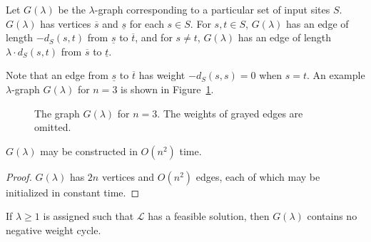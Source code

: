 \documentclass{llncs}
\def \figurescale {.85}
\begin{document}
\begin{definition}
\label{definition:G}
Let $G(\lambda)$ be the $\lambda$-graph corresponding to a particular set of input sites $S$.  $G(\lambda)$ has vertices $\overline{s}$ and $\underline{s}$ for each $s \in S$.  For $s,t \in S$, $G(\lambda)$ has an edge of length $-d_S(s,t)$ from $\underline{s}$ to $\overline{t}$, and for $s \ne t$, $G(\lambda)$ has an edge of length $\lambda \cdot d_S(s,t)$ from $\overline{s}$ to $\underline{t}$.
\end{definition}

\noindent Note that an edge from $\underline{s}$ to $\overline{t}$ has weight $-d_S(s,s)=0$ when $s=t$.  An example $\lambda$-graph $G(\lambda)$ for $n=3$ is shown in Figure~\ref{figure:G}.

\begin{figure}
\centering
\scalebox{\figurescale}{\texttt{[image: G.eps]}}
\caption{The graph $G(\lambda)$ for $n=3$.  The weights of grayed edges are omitted.}
\label{figure:G}
\end{figure}

\begin{lemma}
\label{lemma:make_graph_basics}
$G(\lambda)$ may be constructed in $O(n^2)$ time.
\end{lemma}

\begin{proof}
$G(\lambda)$ has $2n$ vertices and $O(n^2)$ edges, each of which may be initialized in constant time.
\end{proof}


\begin{lemma}
\label{lemma:nnwc_implies_feasible}
If $\lambda \geq 1$ is assigned such that $\mathcal{L}$ has a feasible solution, then $G(\lambda)$ contains no negative weight cycle.
\end{lemma}
\end{document}
